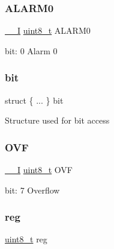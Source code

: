 \subsubsection{\texorpdfstring{ALARM0}{ALARM0}}
{\footnotesize\ttfamily \mbox{\hyperlink{core__cm0plus_8h_af63697ed9952cc71e1225efe205f6cd3}{\+\_\+\+\_\+I}} \mbox{\hyperlink{union_r_t_c___m_o_d_e2___i_n_t_f_l_a_g___type_a5b4208c6f4c4a4290c4f2804d1eb1d5b}{uint8\+\_\+t}} A\+L\+A\+R\+M0}

bit\+: 0 Alarm 0 \mbox{\label{union_r_t_c___m_o_d_e2___i_n_t_f_l_a_g___type_a99b9be019ce440c5c35b8a0167c158bf}} 
\subsubsection{\texorpdfstring{bit}{bit}}
{\footnotesize\ttfamily struct \{ ... \}   bit}

Structure used for bit access \mbox{\label{union_r_t_c___m_o_d_e2___i_n_t_f_l_a_g___type_a52c588fc013d003e33ea581b20d4ba73}} 
\subsubsection{\texorpdfstring{OVF}{OVF}}
{\footnotesize\ttfamily \mbox{\hyperlink{core__cm0plus_8h_af63697ed9952cc71e1225efe205f6cd3}{\+\_\+\+\_\+I}} \mbox{\hyperlink{union_r_t_c___m_o_d_e2___i_n_t_f_l_a_g___type_a5b4208c6f4c4a4290c4f2804d1eb1d5b}{uint8\+\_\+t}} O\+VF}

bit\+: 7 Overflow \mbox{\label{union_r_t_c___m_o_d_e2___i_n_t_f_l_a_g___type_a9428adc9af4653a2050e2536b55dec8d}} 
\subsubsection{\texorpdfstring{reg}{reg}}
{\footnotesize\ttfamily \mbox{\hyperlink{union_r_t_c___m_o_d_e2___i_n_t_f_l_a_g___type_a5b4208c6f4c4a4290c4f2804d1eb1d5b}{uint8\+\_\+t}} reg}

